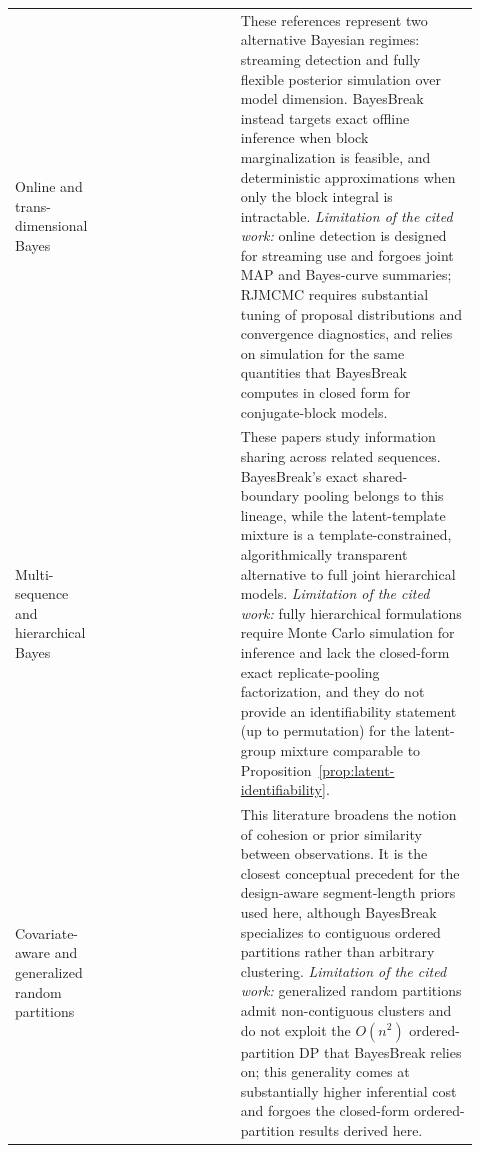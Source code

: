 \begin{longtable}{p{0.17\linewidth}p{0.27\linewidth}p{0.48\linewidth}}
Online and trans-dimensional Bayes &
\citet{adamsmackay2007bocpd, green1995rjMCMC, denison1998bayesian} &
These references represent two alternative Bayesian regimes: streaming detection and fully flexible
posterior simulation over model dimension. BayesBreak instead targets exact offline inference when
block marginalization is feasible, and deterministic approximations when only the block integral is
intractable. \emph{Limitation of the cited work:} online detection \citep{adamsmackay2007bocpd} is
designed for streaming use and forgoes joint MAP and Bayes-curve summaries; RJMCMC
\citep{green1995rjMCMC} requires substantial tuning of proposal distributions and convergence
diagnostics, and \citet{denison1998bayesian} relies on simulation for the same quantities that
BayesBreak computes in closed form for conjugate-block models. \\

Multi-sequence and hierarchical Bayes &
\citet{carlin1992hierBayesCP, fan2017basic, quinlan2024jrpm} &
These papers study information sharing across related sequences. BayesBreak's exact shared-boundary
pooling belongs to this lineage, while the latent-template mixture is a template-constrained,
algorithmically transparent alternative to full joint hierarchical models. \emph{Limitation of the
cited work:} fully hierarchical formulations require Monte Carlo simulation for inference and lack
the closed-form exact replicate-pooling factorization, and they do not provide an identifiability
statement (up to permutation) for the latent-group mixture comparable to
Proposition~\ref{prop:latent-identifiability}. \\

Covariate-aware and generalized random partitions &
\citet{muller2011ppmx, park2010gppm} &
This literature broadens the notion of cohesion or prior similarity between observations. It is the
closest conceptual precedent for the design-aware segment-length priors used here, although BayesBreak
specializes to contiguous ordered partitions rather than arbitrary clustering. \emph{Limitation of the
cited work:} generalized random partitions admit non-contiguous clusters and do not exploit the
$O(n^2)$ ordered-partition DP that BayesBreak relies on; this generality comes at substantially
higher inferential cost and forgoes the closed-form ordered-partition results derived here. \\


\end{longtable}
